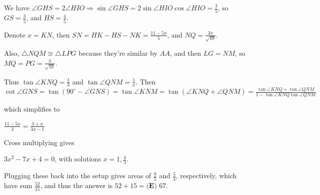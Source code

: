 \begin{enumerate}
 We have $\angle GHS = 2 \angle HIO \Longrightarrow \sin \angle GHS = 2 \sin \angle HIO \cos \angle HIO = \frac{3}{5}$, so $GS = \frac{3}{5}$, and $HS=\frac{4}{5}$. 

 Denote $x=KN$, then $SN=HK-HS-NK=\frac{11-5x}{5}$, and $NQ=\frac{3x}{\sqrt{10}}$. 

 Also, $\triangle NQM \cong \triangle LPG$ because they're similar by $AA$, and then $LG=NM$, so $MQ=PG=\frac{3}{\sqrt{10}}$. 

 
Thus $\tan \angle KNQ = \frac{1}{3}$ and $\tan \angle QNM = \frac{1}{x}$. Then $\cot \angle GNS = \tan (90 ^{\circ} - \angle GNS) = \tan \angle KNM = \tan (\angle KNQ + \angle QNM) = \frac{\tan \angle KNQ + \tan \angle QNM}{1-\tan \angle KNQ \tan \angle QNM}$

 which simplifies to

 $\frac{11-5x}{3}=\frac{3+x}{3x-1}$

 Cross multiplying gives

 $3x^2-7x+4=0$, with solutions $x=1,\frac{4}{3}$. 

 Plugging these back into the setup gives areas of $\frac{9}{5}$ and $\frac{5}{3}$, respectively, which have sum $\frac{52}{15}$, and thus the answer is $52+15=\boxed{\textbf{(E) }67}.$



\end{enumerate}